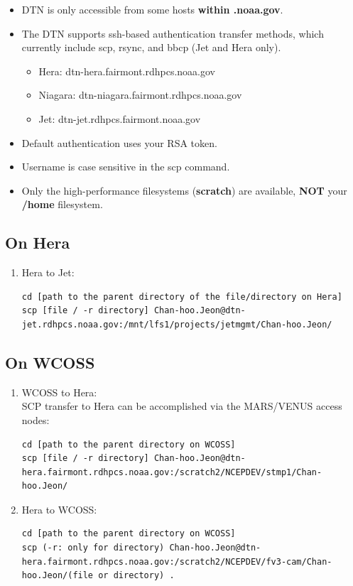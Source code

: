 \documentclass[11pt,fleqn]{report}              %
\begin{document}
\begin{itemize}
\item DTN is only accessible from some hosts {\bf within .noaa.gov}.
\item The DTN supports ssh-based authentication transfer methods, which currently include scp, rsync, and bbcp (Jet and Hera only). 
   \begin{itemize}
   \item Hera: dtn-hera.fairmont.rdhpcs.noaa.gov
   \item Niagara: dtn-niagara.fairmont.rdhpcs.noaa.gov
   \item Jet: dtn-jet.rdhpcs.fairmont.noaa.gov
   \end{itemize}
\item Default authentication uses your RSA token.
\item Username is case sensitive in the scp command.
\item Only the high-performance filesystems ({\bf scratch}) are available, {\bf NOT} your {\bf /home} filesystem. 
\end{itemize}


\subsection{On Hera}
\begin{enumerate}
\item Hera to Jet:
\lstset{language=bash}   
\begin{lstlisting}[frame=trBL]
cd [path to the parent directory of the file/directory on Hera]
scp [file / -r directory] Chan-hoo.Jeon@dtn-jet.rdhpcs.noaa.gov:/mnt/lfs1/projects/jetmgmt/Chan-hoo.Jeon/
\end{lstlisting}

\end{enumerate}


\subsection{On WCOSS}
\begin{enumerate}
\item WCOSS to Hera: \\
SCP transfer to Hera can be accomplished via the MARS/VENUS access nodes:
\lstset{language=bash}   
\begin{lstlisting}[frame=trBL]
cd [path to the parent directory on WCOSS]
scp [file / -r directory] Chan-hoo.Jeon@dtn-hera.fairmont.rdhpcs.noaa.gov:/scratch2/NCEPDEV/stmp1/Chan-hoo.Jeon/
\end{lstlisting}

\item Hera to WCOSS: 
\lstset{language=bash}   
\begin{lstlisting}[frame=trBL]
cd [path to the parent directory on WCOSS]
scp (-r: only for directory) Chan-hoo.Jeon@dtn-hera.fairmont.rdhpcs.noaa.gov:/scratch2/NCEPDEV/fv3-cam/Chan-hoo.Jeon/(file or directory) .
\end{lstlisting}

\end{enumerate}
\end{document}
